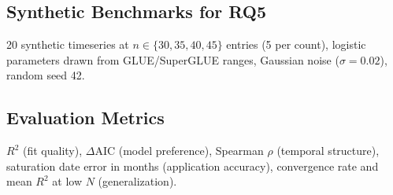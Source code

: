 \subsection{Synthetic Benchmarks for RQ5}

20 synthetic timeseries at $n \in \{30, 35, 40, 45\}$ entries (5 per count), logistic parameters drawn from GLUE/SuperGLUE ranges, Gaussian noise ($\sigma = 0.02$), random seed 42.

\subsection{Evaluation Metrics}

$R^2$ (fit quality), $\Delta$AIC (model preference), Spearman $\rho$ (temporal structure), saturation date error in months (application accuracy), convergence rate and mean $R^2$ at low $N$ (generalization).
